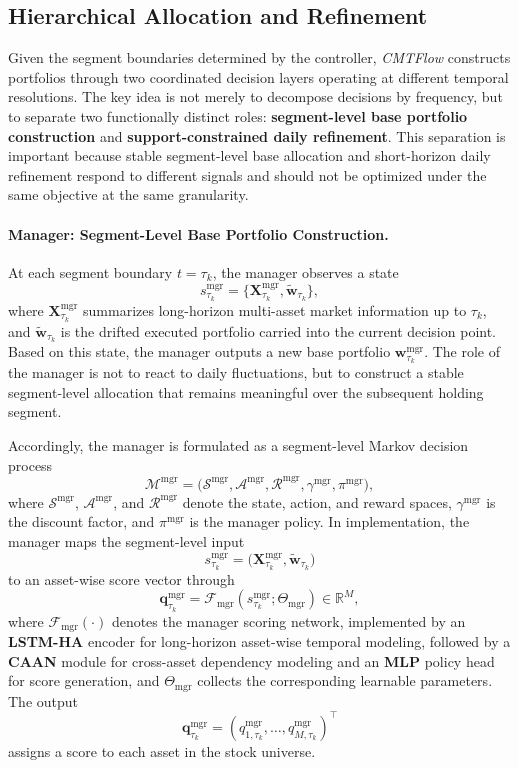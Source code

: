 \documentclass[letterpaper]{article} %
\begin{document}
\subsection{Hierarchical Allocation and Refinement}

Given the segment boundaries determined by the controller, \textit{CMTFlow} constructs portfolios through two coordinated decision layers operating at different temporal resolutions. The key idea is not merely to decompose decisions by frequency, but to separate two functionally distinct roles: \textbf{segment-level base portfolio construction} and \textbf{support-constrained daily refinement}. This separation is important because stable segment-level base allocation and short-horizon daily refinement respond to different signals and should not be optimized under the same objective at the same granularity.

\paragraph{Manager: Segment-Level Base Portfolio Construction.}
At each segment boundary \(t=\tau_k\), the manager observes a state
\[
s^{\mathrm{mgr}}_{\tau_k}
=
\bigl\{\mathbf{X}^{\mathrm{mgr}}_{\tau_k},\tilde{\mathbf{w}}_{\tau_k}\bigr\},
\]
where \(\mathbf{X}^{\mathrm{mgr}}_{\tau_k}\) summarizes long-horizon multi-asset market information up to \(\tau_k\), and \(\tilde{\mathbf{w}}_{\tau_k}\) is the drifted executed portfolio carried into the current decision point. Based on this state, the manager outputs a new base portfolio \(\mathbf{w}^{\mathrm{mgr}}_{\tau_k}\). The role of the manager is not to react to daily fluctuations, but to construct a stable segment-level allocation that remains meaningful over the subsequent holding segment.

Accordingly, the manager is formulated as a segment-level Markov decision process
\[
\mathcal{M}^{\mathrm{mgr}}
=
\bigl(
\mathcal{S}^{\mathrm{mgr}},
\mathcal{A}^{\mathrm{mgr}},
\mathcal{R}^{\mathrm{mgr}},
\gamma^{\mathrm{mgr}},
\pi^{\mathrm{mgr}}
\bigr),
\]
where \(\mathcal{S}^{\mathrm{mgr}}\), \(\mathcal{A}^{\mathrm{mgr}}\), and \(\mathcal{R}^{\mathrm{mgr}}\) denote the state, action, and reward spaces, \(\gamma^{\mathrm{mgr}}\) is the discount factor, and \(\pi^{\mathrm{mgr}}\) is the manager policy. In implementation, the manager maps the segment-level input
\[
s_{\tau_k}^{\mathrm{mgr}}
=
\bigl(
\mathbf{X}_{\tau_k}^{\mathrm{mgr}},
\tilde{\mathbf{w}}_{\tau_k}
\bigr)
\]
to an asset-wise score vector through
\[
\mathbf{q}_{\tau_k}^{\mathrm{mgr}}
=
\mathcal{F}_{\mathrm{mgr}}
\!\left(
s_{\tau_k}^{\mathrm{mgr}};
\Theta_{\mathrm{mgr}}
\right)
\in\mathbb{R}^{M},
\]
where \(\mathcal{F}_{\mathrm{mgr}}(\cdot)\) denotes the manager scoring network, implemented by an \textbf{LSTM-HA} \citep{alphastock} encoder for long-horizon asset-wise temporal modeling, followed by a \textbf{CAAN} \citep{alphastock} module for cross-asset dependency modeling and an \textbf{MLP} policy head for score generation, and \(\Theta_{\mathrm{mgr}}\) collects the corresponding learnable parameters. The output
\[
\mathbf{q}_{\tau_k}^{\mathrm{mgr}}
=
(q_{1,\tau_k}^{\mathrm{mgr}},\dots,q_{M,\tau_k}^{\mathrm{mgr}})^\top
\]
assigns a score to each asset in the stock universe.
\end{document}
